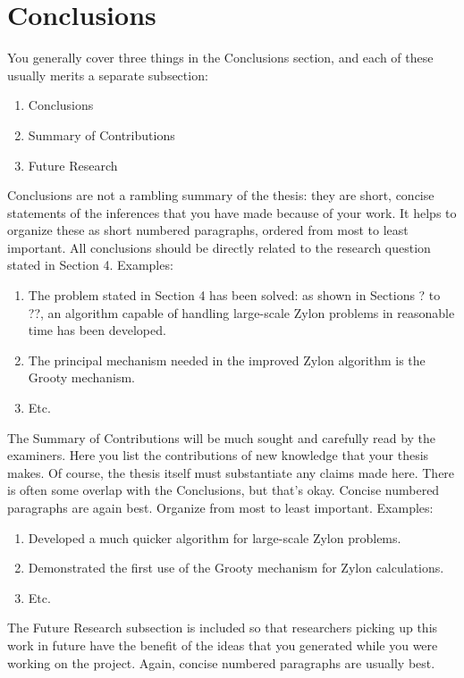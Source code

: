 \chapter{Conclusions}
\label{chap:conclusions}
You generally cover three things in the Conclusions section, and each of these
usually merits a separate subsection:

\begin{enumerate}
    \item Conclusions
    \item Summary of Contributions
    \item Future Research
\end{enumerate}

Conclusions are not a rambling summary of the thesis: they are short, concise
statements of the inferences that you have made because of your work. It helps
to organize these as short numbered paragraphs, ordered from most to least
important. All conclusions should be directly related to the research question
stated in Section 4. Examples:

\begin{enumerate}
    \item The problem stated in Section 4 has been solved: as shown in Sections ? to
    ??, an algorithm capable of handling large-scale Zylon problems in reasonable
    time has been developed.
    \item The principal mechanism needed in the improved Zylon algorithm is the Grooty mechanism.
    \item Etc.
\end{enumerate}

The Summary of Contributions will be much sought and carefully read by the
examiners. Here you list the contributions of new knowledge that your thesis
makes. Of course, the thesis itself must substantiate any claims made here.
There is often some overlap with the Conclusions, but that's okay. Concise
numbered paragraphs are again best. Organize from most to least important.
Examples:

\begin{enumerate}
    \item Developed a much quicker algorithm for large-scale Zylon problems.
    \item Demonstrated the first use of the Grooty mechanism for Zylon calculations.
    \item Etc.
\end{enumerate}

The Future Research subsection is included so that researchers picking up this
work in future have the benefit of the ideas that you generated while you were
working on the project. Again, concise numbered paragraphs are usually best. 

